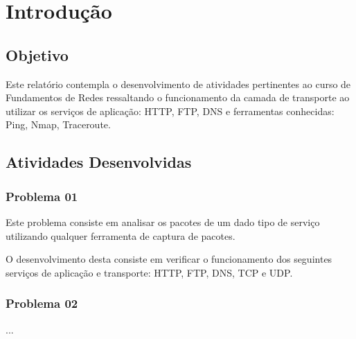 \chapter[Introdução]{Introdução}

\section{Objetivo}
Este relatório contempla o desenvolvimento de atividades pertinentes ao curso de Fundamentos de Redes
ressaltando o funcionamento da camada de transporte ao utilizar os serviços de aplicação: HTTP, FTP, DNS e ferramentas
conhecidas: Ping, Nmap, Traceroute.

\section{Atividades Desenvolvidas}

\subsection{Problema 01}
Este problema consiste em analisar os pacotes de um dado tipo de serviço utilizando qualquer ferramenta
de captura de pacotes.

O desenvolvimento desta consiste em verificar o funcionamento dos seguintes serviços de aplicação
e transporte: HTTP, FTP, DNS, TCP e UDP.

\subsection{Problema 02}

...
